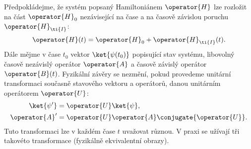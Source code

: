 Předpokládejme, že systém popsaný Hamiltoniánem $\operator{H}$ lze rozložit na část $\operator{H}_{0}$ nezávisející na čase a na časově závislou poruchu $\operator{H}_{\ti{I}}$:
\begin{equation}
    \operator{H}(t)=\operator{H}_{0}+\operator{H}_{\ti{I}}(t).
\end{equation}	
Dále mějme v čase $t_{0}$ vektor $\ket{\psi(t_{0})}$ popisující stav systému, libovolný časově nezávislý operátor $\operator{A}$ a časově závislý operátor $\operator{B}(t)$.
Fyzikální závěry se nezmění, pokud provedeme unitární transformaci současně stavového vektoru a operátorů, danou unitárním operátorem $\operator{U}$:
\begin{subequations}
    \begin{align}
        \ket{\psi'}
            &=\operator{U}\ket{\psi},\\
        \operator{A}'
            &=\operator{U}\operator{A}\conjugate{\operator{U}}.
    \end{align}			
\end{subequations}
Tuto transformaci lze v každém čase $t$ uvažovat různou.
V praxi se užívají tři takovéto transformace (fyzikálně ekvivalentní obrazy).

